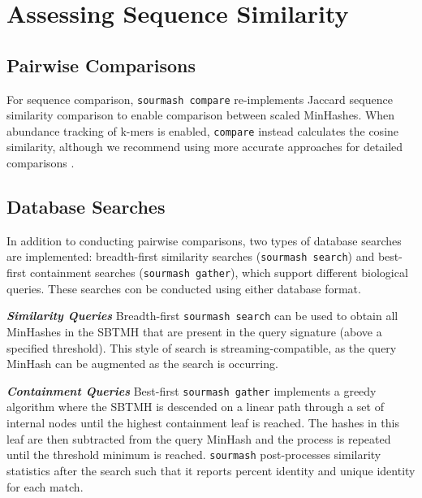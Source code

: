 \documentclass[10pt,a4paper,twocolumn]{article}
\begin{document}

\section*{Assessing Sequence Similarity}

\subsection*{Pairwise Comparisons}

For sequence comparison, \lstinline{sourmash compare} re-implements Jaccard sequence similarity comparison to enable comparison between scaled MinHashes. When abundance tracking of k-mers is enabled, \lstinline{compare} instead calculates the cosine similarity, although we recommend using more accurate approaches for detailed comparisons \cite{hulkrowe}.

\subsection*{Database Searches}
In addition to conducting pairwise comparisons, two types of database searches are implemented: breadth-first similarity searches (\lstinline{sourmash search}) and best-first containment searches (\lstinline{sourmash gather}), which support different biological queries. These searches con be conducted using either database format. 

\textit{\textbf{Similarity Queries}} Breadth-first \lstinline{sourmash search} can be used to obtain all MinHashes in the SBTMH that are present in the query signature (above a specified threshold). This style of search is streaming-compatible, as the query MinHash can be augmented as the search is occurring.

\textit{\textbf{Containment Queries}}
 Best-first \lstinline{sourmash gather} implements a greedy algorithm where the SBTMH is descended on a linear path through a set of internal nodes until the highest containment leaf is reached. The hashes in this leaf are then subtracted from the query MinHash and the process is repeated until the threshold minimum is reached. \lstinline{sourmash} post-processes similarity statistics after the search such that it reports percent identity and unique identity for each match.
\end{document}
